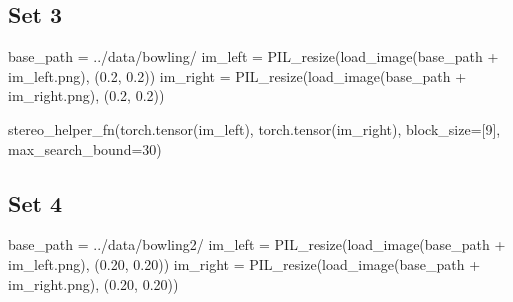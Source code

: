 \documentclass[
  letterpaper,
  DIV=11,
  numbers=noendperiod]{scrartcl}
\newenvironment{Shaded}{\begin{snugshade}}{\end{snugshade}}
\newcommand{\DecValTok}[1]{\textcolor[rgb]{0.68,0.00,0.00}{#1}}
\newcommand{\FloatTok}[1]{\textcolor[rgb]{0.68,0.00,0.00}{#1}}
\newcommand{\NormalTok}[1]{\textcolor[rgb]{0.00,0.23,0.31}{#1}}
\newcommand{\OperatorTok}[1]{\textcolor[rgb]{0.37,0.37,0.37}{#1}}
\newcommand{\StringTok}[1]{\textcolor[rgb]{0.13,0.47,0.30}{#1}}
\begin{document}
\hypertarget{set-3}{%
\subsection{Set 3}\label{set-3}}

\begin{Shaded}
\begin{Highlighting}[]
\NormalTok{base\_path }\OperatorTok{=} \StringTok{\textquotesingle{}../data/bowling/\textquotesingle{}}
\NormalTok{im\_left }\OperatorTok{=}\NormalTok{ PIL\_resize(load\_image(base\_path }\OperatorTok{+} \StringTok{\textquotesingle{}im\_left.png\textquotesingle{}}\NormalTok{), (}\FloatTok{0.2}\NormalTok{, }\FloatTok{0.2}\NormalTok{))}
\NormalTok{im\_right }\OperatorTok{=}\NormalTok{ PIL\_resize(load\_image(base\_path }\OperatorTok{+} \StringTok{\textquotesingle{}im\_right.png\textquotesingle{}}\NormalTok{), (}\FloatTok{0.2}\NormalTok{, }\FloatTok{0.2}\NormalTok{))}
\end{Highlighting}
\end{Shaded}

\begin{Shaded}
\begin{Highlighting}[]
\NormalTok{stereo\_helper\_fn(torch.tensor(im\_left), torch.tensor(im\_right), block\_size}\OperatorTok{=}\NormalTok{[}\DecValTok{9}\NormalTok{], max\_search\_bound}\OperatorTok{=}\DecValTok{30}\NormalTok{)}
\end{Highlighting}
\end{Shaded}

\hypertarget{set-4}{%
\subsection{Set 4}\label{set-4}}

\begin{Shaded}
\begin{Highlighting}[]
\NormalTok{base\_path }\OperatorTok{=} \StringTok{\textquotesingle{}../data/bowling2/\textquotesingle{}}
\NormalTok{im\_left }\OperatorTok{=}\NormalTok{ PIL\_resize(load\_image(base\_path }\OperatorTok{+} \StringTok{\textquotesingle{}im\_left.png\textquotesingle{}}\NormalTok{), (}\FloatTok{0.20}\NormalTok{, }\FloatTok{0.20}\NormalTok{))}
\NormalTok{im\_right }\OperatorTok{=}\NormalTok{ PIL\_resize(load\_image(base\_path }\OperatorTok{+} \StringTok{\textquotesingle{}im\_right.png\textquotesingle{}}\NormalTok{), (}\FloatTok{0.20}\NormalTok{, }\FloatTok{0.20}\NormalTok{))}
\end{Highlighting}
\end{Shaded}
\end{document}
